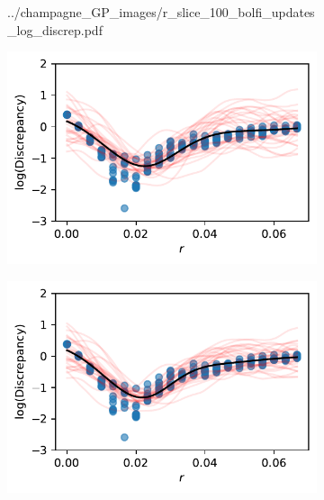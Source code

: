 \begin{figure}[htbp]
\begin{subfigure}[b]{0.5\textwidth}
{            ../champagne_GP_images/r_slice_100_bolfi_updates_log_discrep.pdf
        }
    \end{subfigure}
    \hfill%
    \begin{subfigure}[b]{0.5\textwidth}
        \centering
        \includegraphics[width=\textwidth]{
            ../champagne_GP_images/r_slice_200_bolfi_updates_log_discrep.pdf
        }
    \end{subfigure}%
    \hfill%
    \begin{subfigure}[b]{0.5\textwidth}
        \centering
        \includegraphics[width=\textwidth]{
            ../champagne_GP_images/r_slice_300_bolfi_updates_log_discrep.pdf
        }
    \end{subfigure}%
    \hfill%
    \begin{subfigure}[b]{0.5\textwidth}
        \centering

\end{subfigure}
\end{figure}
